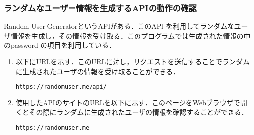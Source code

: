 \documentclass[12pt]{jsarticle}
\begin{document}
\subsubsection{ランダムなユーザー情報を生成するAPIの動作の確認}\label{sec:api}
Random User GeneratorというAPIがある．このAPI を利用してランダムなユーザ情報を生成し，その情報を受け取る．このプログラムでは生成された情報の中のpassword の項目を利用している．

\begin{enumerate}
\item 以下にURLを示す．このURLに対し，リクエストを送信することでランダムに生成されたユーザの情報を受け取ることができる．
\begin{verbatim}
https://randomuser.me/api/
\end{verbatim}
\item 使用したAPIのサイトのURLを以下に示す．このページをWebブラウザで開くとその際にランダムに生成されたユーザの情報を確認することができる．
\begin{verbatim}
https://randomuser.me
\end{verbatim}
\end{enumerate}
\end{document}
